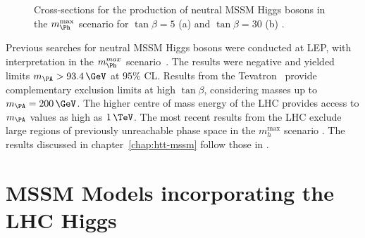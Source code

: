 \begin{figure}[htbp]
\caption[Cross-sections for the production of neutral MSSM Higgs bosons in the 
$m_{\Ph}^{\text{max}}$ scenario.]{Cross-sections for the production of neutral MSSM Higgs bosons in the 
$m_{\Ph}^{\text{max}}$ scenario for $\tan\beta=5$ (a) and $\tan\beta=30$
(b) \cite{Heinemeyer:2013tqa}.}
\label{fig:mhmaxXSs}
\end{figure}

Previous searches for neutral \ac{MSSM} Higgs bosons were conducted at LEP, with
interpretation in the $m_{\Ph}^{max}$ scenario~\cite{Schael:2006cr}.
The results were negative and yielded limits $m_{\PA} > 93.4\,\GeV$ at $95\%$ CL.  
Results from the Tevatron~\cite{Benjamin:2010xb} provide complementary exclusion 
limits at high $\tan\beta$, considering masses up to $m_{\PA}=200\,\GeV$. The
higher centre of mass energy of the LHC provides access to $m_{\PA}$ values as
high as $1\,\TeV$. The most recent results from the LHC exclude large regions of
previously unreachable phase space in the $m_{h}^{\text{max}}$ scenario
\cite{Aad:2014vgg,HIG-13-021}. The results discussed in
chapter~\ref{chap:htt-mssm} follow those in \cite{HIG-13-021}.

\section{MSSM Models incorporating the LHC Higgs}
\label{sec:mssmbenchmarks}

